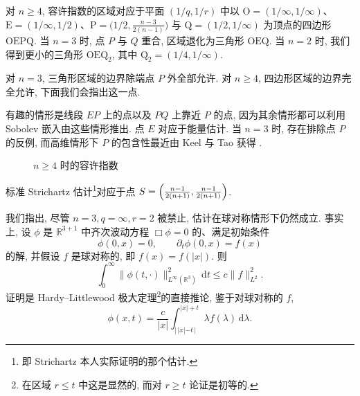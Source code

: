 \begin{remark}\label{rem:c8-0.33}
对 $n\geq4$, 容许指数的区域对应于平面 $(1/q, 1/r)$ 中以
$\mathrm{O}=(1/\infty, 1/\infty)$、$\mathrm{E}=(1/\infty, 1/2)$、$\mathrm{P}=\bigl(1/2, \frac{n-3}{2(n-1)}\bigr)$ 与 $\mathrm{Q}=(1/2, 1/\infty)$ 为顶点的四边形 $\mathrm{OEPQ}$. 当 $n=3$ 时, 点 $P$ 与 $Q$ 重合, 区域退化为三角形 $\mathrm{OEQ}$. 当 $n=2$ 时, 我们得到更小的三角形 $\mathrm{OEQ}_2$, 其中 $\mathrm{Q}_2=(1/4, 1/\infty)$. 

对 $n=3$, 三角形区域的边界除端点 $P$ 外全部允许. 对 $n\geq4$, 四边形区域的边界完全允许, 下面我们会指出这一点. 

有趣的情形是线段 $EP$ 上的点以及 $PQ$ 上靠近 $P$ 的点, 因为其余情形都可以利用 Sobolev 嵌入由这些情形推出. 点 $E$ 对应于能量估计. 当 $n=3$ 时, 存在排除点 $P$ 的反例, 而高维情形下 $P$ 的包含性最近由 Keel 与 Tao 获得 \cite{k-t}. 
\end{remark}

\begin{figure}[htbp]
\centering
%
\caption{$n\geq4$ 时的容许指数}
\end{figure}

标准 Strichartz 估计\footnote{即 Strichartz 本人实际证明的那个估计. }对应于点 $S=\Bigl(\frac{n-1}{2(n+1)}, \frac{n-1}{2(n+1)}\Bigr)$. 

\begin{remark}\label{rem:c8-0.34}
我们指出, 尽管 $n=3, q=\infty, r=2$ 被禁止, 估计在球对称情形下仍然成立. 事实上, 设 $\phi$ 是 $\mathbb{R}^{3+1}$ 中齐次波动方程 $\Box\phi=0$ 的、满足初始条件
\[
\phi(0, x)=0, \qquad \partial_t\phi(0, x)=f(x)
\]
的解, 并假设 $f$ 是球对称的, 即 $f(x)=f(|x|)$. 则
\begin{equation}
\int_0^\infty\|\phi(t, \cdot)\|_{L^\infty(\mathbb{R}^3)}^2\, \mathrm{d}t\leq c\|f\|_{L^2}^2.\label{eq:c8-334}
\end{equation}
证明是 Hardy--Littlewood 极大定理\footnote{在区域 $r\leq t$ 中这是显然的, 而对 $r\geq t$ 论证是初等的. }的直接推论, 鉴于对球对称的 $f$, 
\[
\phi(x, t)=\frac{c}{|x|}\int_{|\, |x|-t\, |}^{|x|+t}\lambda f(\lambda)\, \mathrm{d}\lambda .
\]
\end{remark}

